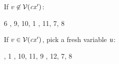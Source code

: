 \begin{bycase}
\Case{\Rstarr}
\begin{derivation}
     {\premof{\Rstarr}}
     {\premof{\Rstarr}}
\end{derivation}
If $v\not\in\mathcal{V}(\mathit{cx}')$:
\begin{derivatioN}{8}
     {6}
     {\indhyp, 9, 10, 1}
     {\Rstarr, 11, 7, 8}
\end{derivatioN}
If $v\in\mathcal{V}(\mathit{cx}')$, pick a fresh variable $u$:
\begin{derivatioN}{8}
     {, 1}
     {\indhyp, 10, 11, 9}
     {\Rstarr, 12, 7, 8}
\end{derivatioN}


\end{bycase}
